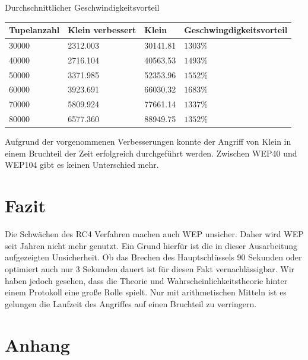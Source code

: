 \documentclass[10pt,a4paper]{article}
\begin{document}
Durchschnittlicher Geschwindigkeitsvorteil\\
\begin{tabular}{|l|l|l|l|}
	\hline
	Tupelanzahl & Klein verbessert   	& Klein  & Geschwingdigkeitsvorteil	 \\
			\hline
		30000& 2312.003& 30141.81 & $1303\%$\\
			\hline
		40000& 2716.104& 40563.53 & $1493\%$\\
			\hline
		50000& 3371.985& 52353.96 & $1552\%$\\
			\hline
		60000& 3923.691& 66030.32 & $1683\%$\\
			\hline
		70000& 5809.924& 77661.14 & $1337\%$\\
			\hline
		80000& 6577.360& 88949.75 & $1352\%$\\
	\hline
	
\end{tabular}

Aufgrund der vorgenommenen Verbesserungen konnte der Angriff von Klein in einem Bruchteil der Zeit erfolgreich durchgeführt werden. Zwischen WEP40 und WEP104 gibt es keinen Unterschied mehr. 

\section{Fazit}

Die Schwächen des RC4 Verfahren machen auch WEP unsicher. 
Daher wird WEP seit Jahren nicht mehr genutzt. Ein Grund hierfür ist die in dieser Ausarbeitung aufgezeigten Unsicherheit. Ob das Brechen des Hauptschlüssels 90 Sekunden oder optimiert auch nur 3 Sekunden dauert ist für diesen Fakt vernachlässigbar. Wir haben jedoch gesehen, dass die Theorie und Wahrscheinlichkeitstheorie hinter einem Protokoll eine große Rolle spielt. Nur mit arithmetischen Mitteln ist es gelungen die Laufzeit des Angriffes auf einen Bruchteil zu verringern.

\section{Anhang}
\end{document}
